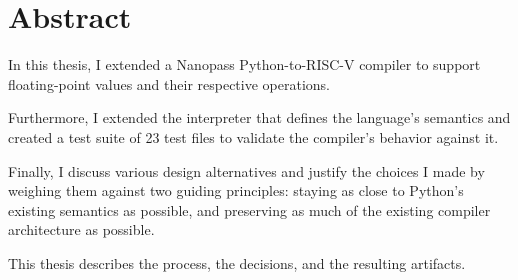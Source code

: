 \chapter*{Abstract}
In this thesis, I extended a Nanopass Python-to-RISC-V compiler to support floating-point values and their respective operations.

Furthermore, I extended the interpreter that defines the language's semantics and created a test suite of 23 test files to validate the compiler's behavior against it.

Finally, I discuss various design alternatives and justify the choices I made by weighing them against two guiding principles: staying as close to Python's existing semantics as possible, and preserving as much of the existing compiler architecture as possible.

This thesis describes the process, the decisions, and the resulting artifacts.